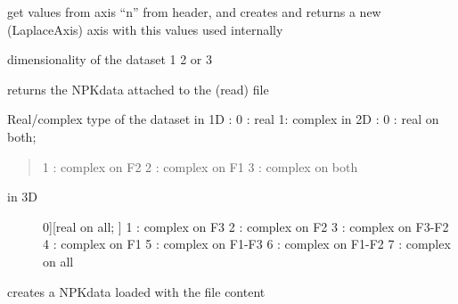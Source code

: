 \documentclass[letterpaper,10pt,openany,oneside]{sphinxmanual}
\begin{document}
\begin{fulllineitems}

\begin{fulllineitems}
\label{rst/code:File.GifaFile.GifaFile.copydiffaxesfromheader}
get values from axis ``n'' from header, and creates and returns a new (LaplaceAxis) axis with this values
used internally

\end{fulllineitems}


\begin{fulllineitems}
\label{rst/code:File.GifaFile.GifaFile.dim}
dimensionality of the dataset 1 2 or 3

\end{fulllineitems}


\begin{fulllineitems}
\label{rst/code:File.GifaFile.GifaFile.get_data}
returns the NPKdata attached to the (read) file

\end{fulllineitems}


\begin{fulllineitems}
\label{rst/code:File.GifaFile.GifaFile.itype}
Real/complex type of the dataset
in 1D :     0 : real  1: complex
in 2D :     0 : real on both;
\begin{quote}

1 : complex on F2
2 : complex on F1
3 : complex on both
\end{quote}
\begin{description}
\item[{in 3D}] \leavevmode{[}0{]}{[}real on all; {]}
1 : complex on F3
2 : complex on F2
3 : complex on F3-F2
4 : complex on F1
5 : complex on F1-F3
6 : complex on F1-F2
7 : complex on all

\end{description}

\end{fulllineitems}


\begin{fulllineitems}
\label{rst/code:File.GifaFile.GifaFile.load}
creates a NPKdata loaded with the file content


\end{fulllineitems}
\end{fulllineitems}
\end{document}
